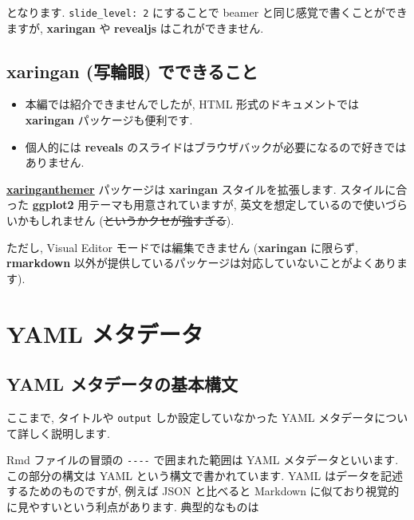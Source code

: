 \documentclass[
]{bxjsarticle}
\providecommand{\tightlist}{%
  \setlength{\itemsep}{0pt}\setlength{\parskip}{0pt}}
\begin{document}
となります. \texttt{slide\_level:\ 2} にすることで beamer と同じ感覚で書くことができますが, \textbf{xaringan} や \textbf{revealjs} はこれができません.

\hypertarget{xaringan-ux5199ux8f2aux773c-ux3067ux3067ux304dux308bux3053ux3068}{%
\subsection{\texorpdfstring{\textbf{xaringan} (写輪眼) でできること}{xaringan (写輪眼) でできること}}\label{xaringan-ux5199ux8f2aux773c-ux3067ux3067ux304dux308bux3053ux3068}}

\begin{itemize}
\tightlist
\item
  本編では紹介できませんでしたが, HTML 形式のドキュメントでは \textbf{xaringan} パッケージも便利です.
\item
  個人的には \textbf{reveals} のスライドはブラウザバックが必要になるので好きではありません.
\end{itemize}

\href{https://pkg.garrickadenbuie.com/xaringanthemer/}{\textbf{xaringanthemer}} パッケージは \textbf{xaringan} スタイルを拡張します. スタイルに合った \textbf{ggplot2} 用テーマも用意されていますが, 英文を想定しているので使いづらいかもしれません (\sout{というかクセが強すぎる}).

ただし, Visual Editor モードでは編集できません (\textbf{xaringan} に限らず, \textbf{rmarkdown} 以外が提供しているパッケージは対応していないことがよくあります).

\hypertarget{yaml-ux30e1ux30bfux30c7ux30fcux30bf}{%
\section{YAML メタデータ}\label{yaml-ux30e1ux30bfux30c7ux30fcux30bf}}

\hypertarget{yaml-ux30e1ux30bfux30c7ux30fcux30bfux306eux57faux672cux69cbux6587}{%
\subsection{YAML メタデータの基本構文}\label{yaml-ux30e1ux30bfux30c7ux30fcux30bfux306eux57faux672cux69cbux6587}}

ここまで, タイトルや \texttt{output} しか設定していなかった YAML メタデータについて詳しく説明します.

Rmd ファイルの冒頭の \texttt{-\/-\/-\/-} で囲まれた範囲は YAML メタデータといいます. この部分の構文は YAML という構文で書かれています. YAML はデータを記述するためのものですが, 例えば JSON と比べると Markdown に似ており視覚的に見やすいという利点があります. 典型的なものは
\end{document}
